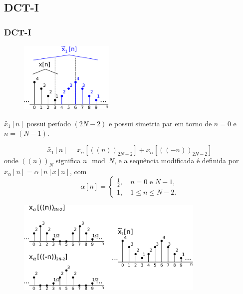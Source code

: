 \subsection{DCT-I}
\begin{frame}[allowframebreaks]
  \frametitle{DCT-I}
    \begin{figure}[ht]
    \centering
    \includegraphics[width=0.4\textwidth]{images/dct-1-ex.pdf}
    \label{fig:DCT-I-a}
    \end{figure}
    $\tilde{x_1}[n]$ possui período $(2N-2)$ e possui simetria par em torno de $n=0$ e $n=(N-1)$.

        \begin{equation}
        \tilde{x_1}[n] = x_{\alpha} \left[ ((n))_{2N-2} \right] + x_{\alpha} \left[ ((-n))_{2N-2} \right]
        \end{equation}
        onde $((n))_N$ significa $n \mod N$, e a sequência modificada é definida por $x_{\alpha}[n] = \alpha[n] x[n]$, com
        \begin{equation}
        \alpha[n] = \begin{cases} \frac{1}{2} , \quad n = 0 \text{ e } N-1, \\
                                1, \quad 1 \leq n \leq N-2 .\end{cases}
        \end{equation}

  \framebreak
    \begin{figure}[ht]
    \centering
    \includegraphics[width=0.8\textwidth]{images/dct-1-parts.pdf}
    \label{fig:DCT-I-parts}
    \end{figure}
  \framebreak


\end{frame}
